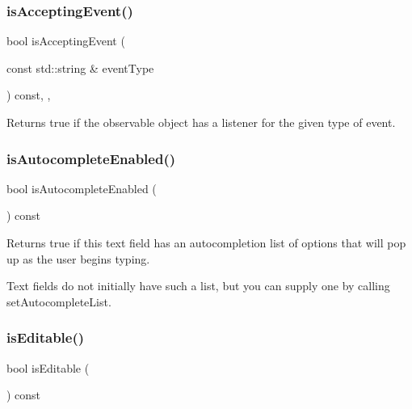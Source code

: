 \subsubsection{\texorpdfstring{is\+Accepting\+Event()}{isAcceptingEvent()}\hspace{0.1cm}{\footnotesize\ttfamily [3/3]}}
{\footnotesize\ttfamily bool is\+Accepting\+Event (\begin{DoxyParamCaption}\item[{const std\+::string \&}]{event\+Type }\end{DoxyParamCaption}) const\hspace{0.3cm}{\ttfamily [protected]}, {\ttfamily [virtual]}, {\ttfamily [inherited]}}



Returns true if the observable object has a listener for the given type of event. 

\mbox{\label{classsgl_1_1GTextField_a7528cfb0542ac5268efe1d7362b89344}} 
\subsubsection{\texorpdfstring{is\+Autocomplete\+Enabled()}{isAutocompleteEnabled()}}
{\footnotesize\ttfamily bool is\+Autocomplete\+Enabled (\begin{DoxyParamCaption}{ }\end{DoxyParamCaption}) const\hspace{0.3cm}{\ttfamily [virtual]}}



Returns true if this text field has an autocompletion list of options that will pop up as the user begins typing. 

Text fields do not initially have such a list, but you can supply one by calling set\+Autocomplete\+List. \mbox{\label{classsgl_1_1GTextField_a012b5afb54e037e6c5498cf0932a521b}} 
\subsubsection{\texorpdfstring{is\+Editable()}{isEditable()}}
{\footnotesize\ttfamily bool is\+Editable (\begin{DoxyParamCaption}{ }\end{DoxyParamCaption}) const\hspace{0.3cm}{\ttfamily [virtual]}}



